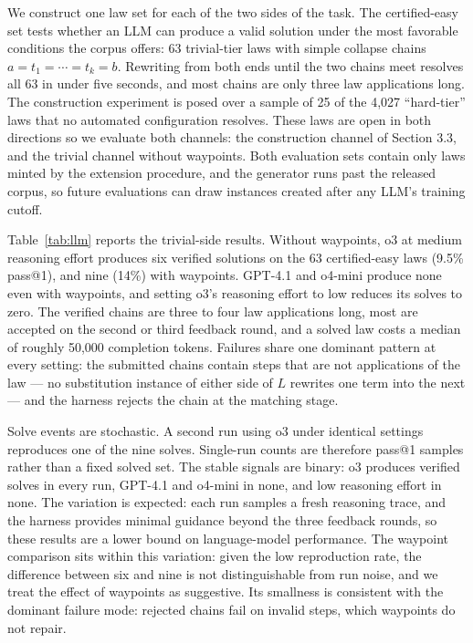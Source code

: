\documentclass[letterpaper]{article} %
\begin{document}
We construct one law set for each of the two sides of the task. The certified-easy set tests whether an LLM can produce a valid solution under the most favorable conditions the corpus offers: 63 trivial-tier laws with simple collapse chains $a = t_1 = \cdots = t_k = b$. Rewriting from both ends until the two chains meet resolves all 63 in under five seconds, and most chains are only three law applications long. The construction experiment is posed over a sample of 25 of the 4,027 ``hard-tier'' laws that no automated configuration resolves. These laws are open in both directions so we evaluate both channels: the construction channel of Section 3.3, and the trivial channel without waypoints. Both evaluation sets contain only laws minted by the extension procedure, and the generator runs past the released corpus, so future evaluations can draw instances created after any LLM's training cutoff.

 


Table~\ref{tab:llm} reports the trivial-side results. Without waypoints, o3 at medium reasoning effort produces six verified solutions on the 63 certified-easy laws (9.5\% pass@1), and nine (14\%) with waypoints. GPT-4.1 and o4-mini produce none even with waypoints, and setting o3's reasoning effort to low reduces its solves to zero. The verified chains are three to four law applications long, most are accepted on the second or third feedback round, and a solved law costs a median of roughly 50,000 completion tokens. Failures share one dominant pattern at every setting: the submitted chains contain steps that are not applications of the law --- no substitution instance of either side of $L$ rewrites one term into the next --- and the harness rejects the chain at the matching stage.

Solve events are stochastic. A second run using o3 under identical settings reproduces one of the nine solves. Single-run counts are therefore pass@1 samples rather than a fixed solved set. The stable signals are binary: o3 produces verified solves in every run, GPT-4.1 and o4-mini in none, and low reasoning effort in none. The variation is expected: each run samples a fresh reasoning trace, and the harness provides minimal guidance beyond the three feedback rounds, so these results are a lower bound on language-model performance. The waypoint comparison sits within this variation: given the low reproduction rate, the difference between six and nine is not distinguishable from run noise, and we treat the effect of waypoints as suggestive. Its smallness is consistent with the dominant failure mode: rejected chains fail on invalid steps, which waypoints do not repair.
 
\end{document}
